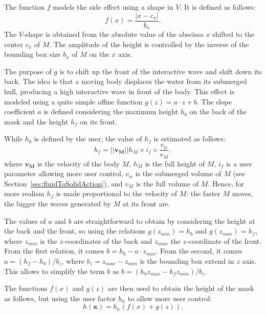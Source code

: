 \documentclass[11pt]{article}
\begin{document}
The function $f$ models the side effect using a shape in $V$.
It is defined as follows:
\begin{equation}
	f(x) = \frac{\left|x-c_x\right|}{b_x}.
\end{equation}
The $V$-shape is obtained from the absolute value of the abscissa $x$ shifted to the center $c_x$ of $M$.
The amplitude of the height is controlled by the inverse of the bounding box size $b_x$ of $M$ on the $x$ axis.

The purpose of $g$ is to shift up the front of the interactive wave and shift down its back.
The idea is that a moving body displaces the water from its submerged hull, producing a high interactive wave in front of the body.
This effect is modeled using a quite simple affine function $g(z)=a\cdot z+b$.
The slope coefficient $a$ is defined considering the maximum height $h_b$ on the back of the mask and the height $h_f$ on its front.

While $h_b$ is defined by the user, the value of $h_f$ is estimated as follows:
\begin{equation}
	h_f = ||\mathbf{v_M}||h_{M}\times i_f\times\frac{v_w}{v_{M}},
\end{equation}
where $\mathbf{v_M}$ is the velocity of the body $M$, $h_M$ is the full height of $M$, $i_f$ is a user parameter allowing more user control, $v_w$ is the submerged volume of $M$ (see Section~\ref{sec:fluidToSolidAction}), and $v_{M}$ is the full volume of $M$.
Hence, for more realism $h_f$ is made proportional to the velocity of $M$:
the faster $M$ moves, the bigger the waves generated by $M$ at its front are.

The values of $a$ and $b$ are straightforward to obtain by considering the height at the back and the front, so using the relations $g(z_{min})=h_b$ and $g(z_{max})=h_f$,
where $z_{min}$ is the $z$-coordinates of the back and $z_{max}$ the $z$-coordinate of the front.
From the first relation, it comes $b=h_b-a\cdot z_{min}$.
From the second, it comes $a=\left(h_f-h_b\right)/b_z$, where $b_z=z_{max}-z_{min}$ is the bounding box extend in $z$ axis.
This allows to simplify the term $b$ as $b=\left(h_bz_{max}-h_fz_{min}\right)/b_z$.

The functions $f(x)$ and $g(z)$ are then used to obtain the height of the mask as follows,
but using the user factor $b_w$ to allow more user control:
\begin{equation}
	\label{equa:mask_full}
	h(\mathbf x)=b_w\left(f(x)+g(z)\right).
\end{equation}
\end{document}
